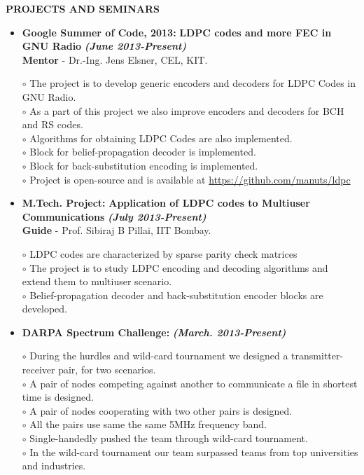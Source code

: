 \documentclass[a4paper,10pt]{article}
\begin{document}
\clearpage
 \colorbox{titleColor}{\parbox{6.5in}{\textbf{PROJECTS AND SEMINARS}}}

 \begin{itemize}
 \setlength{\itemsep}{1pt}
 \item \textbf{Google Summer of Code, 2013:} \textbf{LDPC codes and more FEC in GNU Radio}  \textbf \emph{(June 2013-Present)}\\
        {\textbf{Mentor} - Dr.-Ing. Jens Elsner, CEL, KIT.   }          %

        $\circ$ The project is to develop generic encoders and decoders for LDPC Codes in GNU Radio. \\
        $\circ$ As a part of this project we also improve encoders and decoders for BCH and RS codes. \\
        $\circ$ Algorithms for obtaining LDPC Codes are also implemented. \\
        $\circ$ Block for belief-propagation decoder is implemented. \\
        $\circ$ Block for back-substitution encoding is implemented. \\
        $\circ$ Project is open-source and is available at \url{https://github.com/manuts/ldpc}

        \item \textbf{M.Tech. Project:} \textbf{Application of LDPC codes to Multiuser Communications} \textbf \emph{(July 2013-Present)} \\
        {\textbf{Guide} - Prof. Sibiraj B Pillai, IIT Bombay.}            %
        
$\circ$ LDPC codes are characterized by sparse parity check matrices \\ 
$\circ$ The project is to study LDPC encoding and decoding algorithms and extend them to multiuser scenario. \\
$\circ$ Belief-propagation decoder and back-substitution encoder blocks are developed.

        
\item \textbf{DARPA Spectrum Challenge:} \textbf \emph{(March. 2013-Present)}

$\circ$ During the hurdles and wild-card tournament we designed a transmitter-receiver pair, for two scenarios. \\
$\circ$ A pair of nodes competing against another to communicate a file in shortest time is designed. \\
$\circ$ A pair of nodes cooperating with two other pairs is designed. \\
$\circ$ All the pairs use same the same 5MHz frequency band. \\
$\circ$ Single-handedly pushed the team through wild-card tournament. \\
$\circ$ In the wild-card tournament our team surpassed teams from top universities and industries.


\end{itemize}
\end{document}
